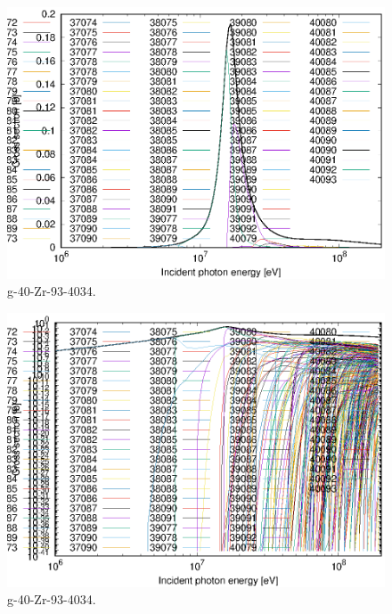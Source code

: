 \begin{figure}
 \includegraphics[width=\linewidth]{eps/g_40-Zr-93_4034.eps}
  \caption{g-40-Zr-93-4034.}
\end{figure}
\begin{figure}
 \includegraphics[width=\linewidth]{eps-log/g_40-Zr-93_4034.eps}
 \caption{g-40-Zr-93-4034.}
\end{figure}
\newpage \clearpage

